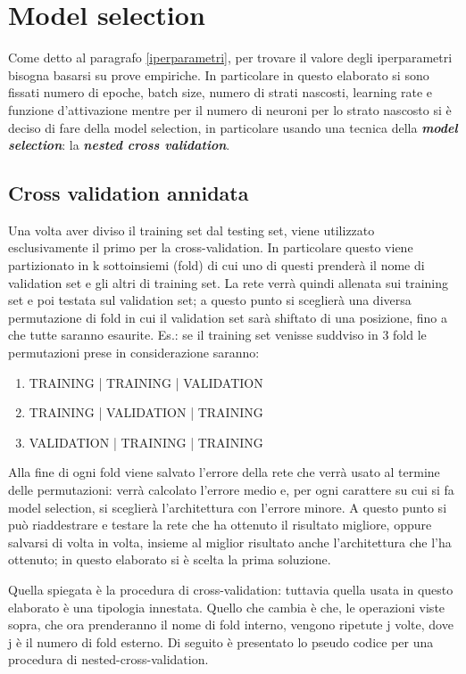 \documentclass[12pt]{report}
\begin{document}
\section{Model selection}
Come detto al paragrafo \ref{iperparametri}, per trovare il valore degli iperparametri bisogna basarsi su prove empiriche. In particolare in questo elaborato si sono fissati numero di epoche, batch size, numero di strati nascosti, learning rate e funzione d'attivazione mentre per il numero di neuroni per lo strato nascosto si è deciso di fare della model selection, in particolare usando una tecnica della \textbf{\textit{model selection}}: la \textbf{\textit{nested cross validation}}.

\subsection{Cross validation annidata}
Una volta aver diviso il training set dal testing set, viene utilizzato esclusivamente  il primo per la cross-validation. In particolare questo viene partizionato in k sottoinsiemi (fold) di cui uno di questi prenderà il nome di validation set e gli altri di training set. La rete verrà quindi allenata sui training set e poi testata sul validation set; a questo punto si sceglierà una diversa permutazione di fold in cui il validation set sarà shiftato di una posizione, fino a che tutte saranno esaurite. 
Es.: se il training set venisse suddviso in 3 fold le permutazioni prese in considerazione saranno:
\begin{enumerate}
\item{TRAINING | TRAINING | VALIDATION}
\item{TRAINING | VALIDATION | TRAINING}
\item{VALIDATION | TRAINING | TRAINING}
\end{enumerate}

Alla fine di ogni fold viene salvato l’errore della rete che verrà usato al termine delle permutazioni: verrà calcolato l’errore medio e, per ogni carattere su cui si fa model selection, si sceglierà l’architettura con l’errore minore. A questo punto si può riaddestrare e testare la rete che ha ottenuto il risultato migliore, oppure salvarsi di volta in volta, insieme al miglior risultato anche l’architettura che l’ha ottenuto; in questo elaborato si è scelta la prima soluzione.

Quella spiegata è la procedura di cross-validation: tuttavia quella usata in questo elaborato è una tipologia innestata. Quello che cambia è che, le operazioni viste sopra, che ora prenderanno il nome di fold interno, vengono ripetute j volte, dove j è il numero di fold esterno. Di seguito è presentato lo pseudo codice per una procedura di nested-cross-validation.
\end{document}

